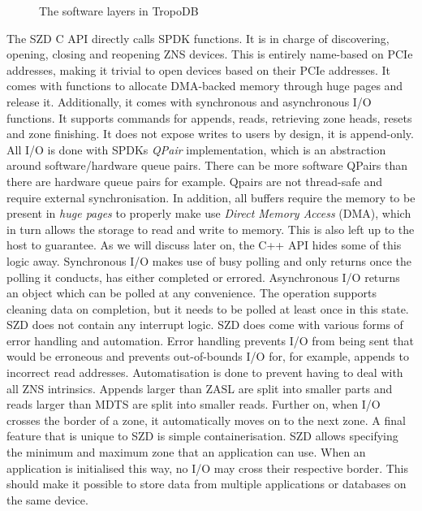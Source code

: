 \begin{figure}[h]
\centering
\begin{minipage}{0.35\textwidth}
  \centering
  
\end{minipage}%
\caption{The software layers in TropoDB}
\label{fig:tropolayers}
\end{figure}

The SZD C API directly calls SPDK functions. It is in charge of discovering, opening, closing and reopening ZNS devices. This is entirely name-based on PCIe addresses, making it trivial to open devices based on their PCIe addresses. It comes with functions to allocate DMA-backed memory through huge pages and release it. Additionally, it comes with synchronous and asynchronous I/O functions. It supports commands for appends, reads, retrieving zone heads, resets and zone finishing. It does not expose writes to users by design, it is append-only. All I/O is done with SPDKs \textit{QPair} implementation, which is an abstraction around software/hardware queue pairs. There can be more software QPairs than there are hardware queue pairs for example. Qpairs are not thread-safe and require external synchronisation. In addition, all buffers require the memory to be present in \textit{huge pages} to properly make use \textit{Direct Memory Access} (DMA), which in turn allows the storage to read and write to memory. This is also left up to the host to guarantee. As we will discuss later on, the C++ API hides some of this logic away. Synchronous I/O makes use of busy polling and only returns once the polling it conducts, has either completed or errored. Asynchronous I/O returns an object which can be polled at any convenience. The operation supports cleaning data on completion, but it needs to be polled at least once in this state. SZD does not contain any interrupt logic. SZD does come with various forms of error handling and automation. Error handling prevents I/O from being sent that would be erroneous and prevents out-of-bounds I/O for, for example, appends to incorrect read addresses. Automatisation is done to prevent having to deal with all ZNS intrinsics. Appends larger than ZASL are split into smaller parts and reads larger than MDTS are split into smaller reads. Further on, when I/O crosses the border of a zone, it automatically moves on to the next zone. A final feature that is unique to SZD is simple containerisation. SZD allows specifying the minimum and maximum zone that an application can use. When an application is initialised this way, no I/O may cross their respective border. This should make it possible to store data from multiple applications or databases on the same device. 

